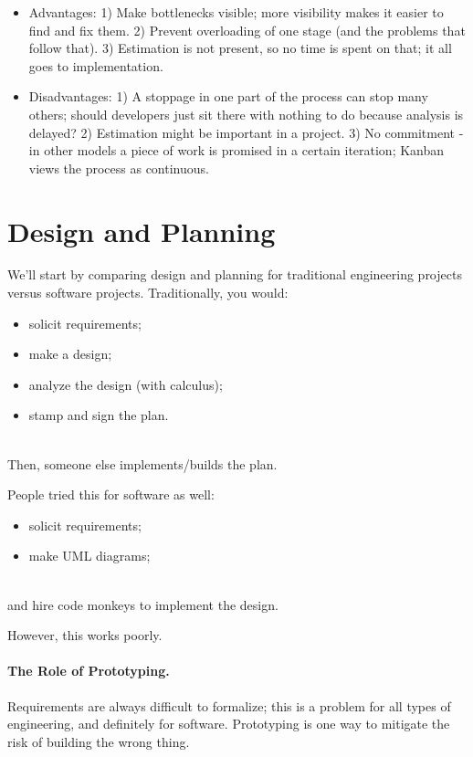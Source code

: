 \begin{itemize} 
	\item Advantages: 1) Make bottlenecks visible; more visibility makes it easier to find and fix them. 2) Prevent overloading of one stage (and the problems that follow that). 3) Estimation is not present, so no time is spent on that; it all goes to implementation.
	\item Disadvantages: 1) A stoppage in one part of the process can stop many others; should developers just sit there with nothing to do because analysis is delayed? 2) Estimation might be important in a project. 3) No commitment - in other models a piece of work is promised in a certain iteration; Kanban views the process as continuous. 
\end{itemize}

\section*{Design and Planning}
We'll start by comparing design and planning for traditional engineering
projects versus software projects.
Traditionally, you would:\\[-2.5em]
\begin{itemize}
\item solicit requirements;
\item make a design;
\item analyze the design (with calculus);
\item stamp and sign the plan.
\end{itemize}~\\[-2.5em]
Then, someone else implements/builds the plan.

People tried this for software as well:\\[-2.5em]
\begin{itemize}
\item solicit requirements;
\item make UML diagrams; 
\end{itemize}~\\[-2.5em]
and hire code monkeys to implement the design.

\noindent However, this works poorly.

\paragraph{The Role of Prototyping.} Requirements are always difficult to 
formalize; this is a problem for all types of engineering, and
definitely for software. Prototyping is one way to mitigate the risk
of building the wrong thing.

